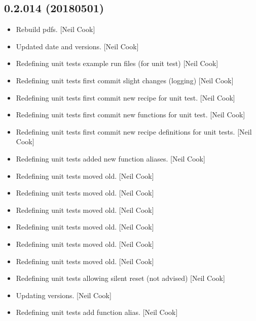 \documentclass[a4paper,10pt,english]{report}
\begin{document}
\subsection{0.2.014 (2018\sphinxhyphen{}05\sphinxhyphen{}01)}
\label{\detokenize{misc/changelog:id465}}\begin{itemize}
\item {} 
Rebuild pdfs. {[}Neil Cook{]}

\item {} 
Updated date and versions. {[}Neil Cook{]}

\item {} 
Redefining unit tests \sphinxhyphen{} example run files (for unit test) {[}Neil Cook{]}

\item {} 
Redefining unit tests \sphinxhyphen{} first commit \sphinxhyphen{} slight changes (logging) {[}Neil
Cook{]}

\item {} 
Redefining unit tests \sphinxhyphen{} first commit \sphinxhyphen{} new recipe for unit test. {[}Neil
Cook{]}

\item {} 
Redefining unit tests \sphinxhyphen{} first commit \sphinxhyphen{} new functions for unit test.
{[}Neil Cook{]}

\item {} 
Redefining unit tests \sphinxhyphen{} first commit \sphinxhyphen{} new recipe definitions for unit
tests. {[}Neil Cook{]}

\item {} 
Redefining unit tests \sphinxhyphen{} added new function aliases. {[}Neil Cook{]}

\item {} 
Redefining unit tests \sphinxhyphen{} moved old. {[}Neil Cook{]}

\item {} 
Redefining unit tests \sphinxhyphen{} moved old. {[}Neil Cook{]}

\item {} 
Redefining unit tests \sphinxhyphen{} moved old. {[}Neil Cook{]}

\item {} 
Redefining unit tests \sphinxhyphen{} moved old. {[}Neil Cook{]}

\item {} 
Redefining unit tests \sphinxhyphen{} moved old. {[}Neil Cook{]}

\item {} 
Redefining unit tests \sphinxhyphen{} moved old. {[}Neil Cook{]}

\item {} 
Redefining unit tests \sphinxhyphen{} allowing silent reset (not advised) {[}Neil
Cook{]}

\item {} 
Updating versions. {[}Neil Cook{]}

\item {} 
Redefining unit tests \sphinxhyphen{} add function alias. {[}Neil Cook{]}

\end{itemize}
\end{document}
